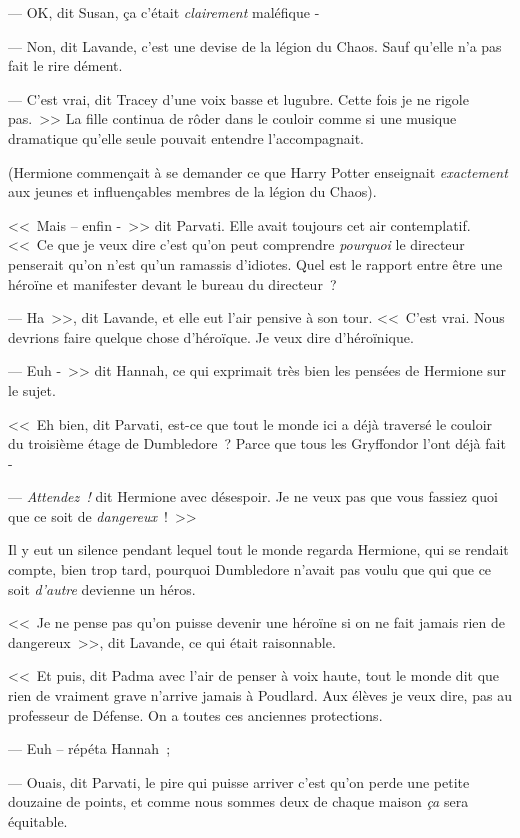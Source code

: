 --- OK, dit Susan, ça c'était \emph{clairement} maléfique -

--- Non, dit Lavande, c'est une devise de la légion du Chaos. Sauf qu'elle n'a pas fait le rire dément.

--- C'est vrai, dit Tracey d'une voix basse et lugubre. Cette fois je ne rigole pas.~>> La fille continua de rôder dans le couloir comme si une musique dramatique qu'elle seule pouvait entendre l'accompagnait.

(Hermione commençait à se demander ce que Harry Potter enseignait \emph{exactement} aux jeunes et influençables membres de la légion du Chaos).

<<~Mais -- enfin -~>> dit Parvati. Elle avait toujours cet air contemplatif. <<~Ce que je veux dire c'est qu'on peut comprendre \emph{pourquoi} le directeur penserait qu'on n'est qu'un ramassis d'idiotes. Quel est le rapport entre être une héroïne et manifester devant le bureau du directeur~?

--- Ha~>>, dit Lavande, et elle eut l'air pensive à son tour. <<~C'est vrai. Nous devrions faire quelque chose d'héroïque. Je veux dire d'héroïnique.

--- Euh -~>> dit Hannah, ce qui exprimait très bien les pensées de Hermione sur le sujet.

<<~Eh bien, dit Parvati, est-ce que tout le monde ici a déjà traversé le couloir du troisième étage de Dumbledore~? Parce que tous les Gryffondor l'ont déjà fait -

--- \emph{Attendez~!} dit Hermione avec désespoir. Je ne veux pas que vous fassiez quoi que ce soit de \emph{dangereux}~!~>>

Il y eut un silence pendant lequel tout le monde regarda Hermione, qui se rendait compte, bien trop tard, pourquoi Dumbledore n'avait pas voulu que qui que ce soit \emph{d'autre} devienne un héros.

<<~Je ne pense pas qu'on puisse devenir une héroïne si on ne fait jamais rien de dangereux~>>, dit Lavande, ce qui était raisonnable.

<<~Et puis, dit Padma avec l'air de penser à voix haute, tout le monde dit que rien de vraiment grave n'arrive jamais à Poudlard. Aux élèves je veux dire, pas au professeur de Défense. On a toutes ces anciennes protections.

--- Euh -- répéta Hannah~;

--- Ouais, dit Parvati, le pire qui puisse arriver c'est qu'on perde une petite douzaine de points, et comme nous sommes deux de chaque maison \emph{ça} sera équitable.

